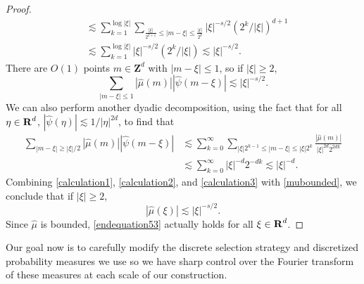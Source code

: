 \begin{proof}
\begin{equation}
\begin{split}
        &\lesssim \sum_{k = 1}^{\log |\xi|} \sum_{\frac{|\xi|}{2^{k+1}} \leq |m - \xi| \leq \frac{|\xi|}{2^{k}}} |\xi|^{-s/2} \left( 2^k/|\xi| \right)^{d+1}\\
        &\lesssim \sum_{k = 1}^{\log |\xi|} |\xi|^{-s/2} (2^k / |\xi| ) \lesssim |\xi|^{-s/2}.
    \end{split}
    \end{equation}
    There are $O(1)$ points $m \in \mathbf{Z}^d$ with $|m - \xi| \leq 1$, so if $|\xi| \geq 2$,
    \begin{equation} \label{calculation2}
        \sum_{|m - \xi| \leq 1} |\widehat{\mu}(m)| |\widehat{\psi}(m - \xi)| \lesssim |\xi|^{-s/2}.
    \end{equation}
    We can also perform another dyadic decomposition, using the fact that for all $\eta \in \operatorname{\mathbf{R}}^d$, $|\widehat{\psi}(\eta)| \lesssim 1/|\eta|^{2d}$, to find that
    \begin{equation} \label{calculation3}
    \begin{split}
        \sum_{|m - \xi| \geq |\xi|/2} |\widehat{\mu}(m)| |\widehat{\psi}(m - \xi)| &\lesssim \sum_{k = 0}^\infty \sum_{|\xi| 2^{k-1} \leq |m - \xi| \leq |\xi| 2^k} \frac{|\widehat{\mu}(m)|}{|\xi|^{2d} 2^{2dk}}\\
        &\lesssim \sum_{k = 0}^\infty |\xi|^{-d} 2^{-dk} \lesssim |\xi|^{-d}.
    \end{split}
    \end{equation}
    Combining \eqref{calculation1}, \eqref{calculation2}, and \eqref{calculation3} with \eqref{mubounded}, we conclude that if $|\xi| \geq 2$,
    \begin{equation} \label{endequation53}
        |\widehat{\mu}(\xi)| \lesssim |\xi|^{-s/2}.
    \end{equation}
    Since $\widehat{\mu}$ is bounded, \eqref{endequation53} actually holds for all $\xi \in \operatorname{\mathbf{R}}^d$.
\end{proof}

Our goal now is to carefully modify the discrete selection strategy and discretized probability measures we use so we have sharp control over the Fourier transform of these measures at each scale of our construction.

